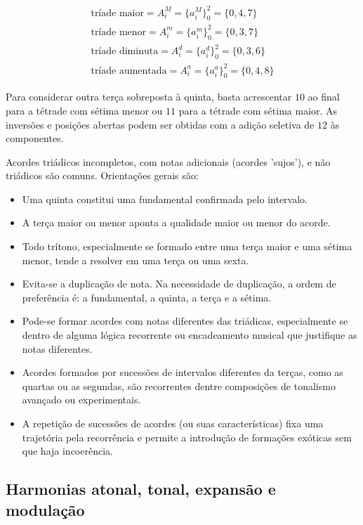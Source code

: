 \begin{equation}\label{triades}
\begin{split}
\text{tríade maior} = A_i^M= \{a_i^M\}_0^2=\{0,4,7\} \\ 
\text{tríade menor} = A_i^m = \{a_i^m\}_0^2=\{0,3,7\} \\
\text{tríade diminuta} = A_i^d = \{a_i^d\}_0^2=\{0,3,6\} \\
\text{tríade aumentada} = A_i^a = \{a_i^a\}_0^2=\{0,4,8\}
\end{split}
\end{equation}

Para considerar outra terça sobreposta à quinta, basta acrescentar $10$ ao final para a tétrade
com sétima menor ou $11$ para a tétrade com sétima maior. As inversões e posições abertas
podem ser obtidas com a adição seletiva de $12$ às componentes.

Acordes triádicos incompletos, com notas adicionais (acordes 'sujos'), e não triádicos são comuns.
Orientações gerais são:
\begin{itemize}
    \item Uma quinta constitui uma fundamental confirmada pelo intervalo.
    \item A terça maior ou menor aponta a qualidade maior ou menor do acorde.
    \item Todo trítono, especialmente se formado entre uma terça maior e uma sétima menor, tende a resolver em uma terça ou uma sexta.
    \item Evita-se a duplicação de nota. Na necessidade de duplicação, a ordem de preferência é: a fundamental, a quinta, a terça e a sétima.
    \item Pode-se formar acordes com notas diferentes das triádicas, especialmente se dentro de alguma lógica recorrente ou encadeamento musical que justifique as notas diferentes.
    \item Acordes formados por sucessões de intervalos diferentes da terças, como as quartas ou as segundas, são recorrentes dentre composições de tonalismo avançado ou experimentais.
    \item A repetição de sucessões de acordes (ou suas características) fixa uma trajetória pela recorrência e permite a introdução de formações exóticas sem que haja incoerência.
\end{itemize}


\subsection{Harmonias atonal, tonal, expansão e modulação}\label{subsec:harmonia}
